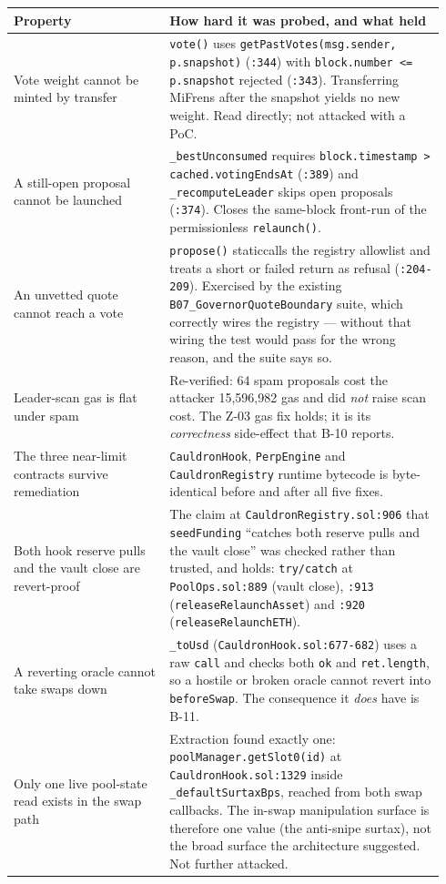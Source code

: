 \documentclass[11pt,a4paper]{article}
\newcommand{\code}[1]{\texttt{\small #1}}
\newcommand{\fileref}[1]{\texttt{\scriptsize #1}}
\begin{document}
\begin{longtable}{@{}p{0.34\linewidth}p{0.60\linewidth}@{}}
\toprule
\textbf{Property} & \textbf{How hard it was probed, and what held} \\
\midrule
\endhead
Vote weight cannot be minted by transfer &
  \code{vote()} uses \code{getPastVotes(msg.sender, p.snapshot)} (\fileref{:344}) with
  \code{block.number <= p.snapshot} rejected (\fileref{:343}). Transferring MiFrens after
  the snapshot yields no new weight. Read directly; not attacked with a PoC. \\
A still-open proposal cannot be launched &
  \code{\_bestUnconsumed} requires \code{block.timestamp > cached.votingEndsAt}
  (\fileref{:389}) and \code{\_recomputeLeader} skips open proposals (\fileref{:374}).
  Closes the same-block front-run of the permissionless \code{relaunch()}. \\
An unvetted quote cannot reach a vote &
  \code{propose()} staticcalls the registry allowlist and treats a short or failed return
  as refusal (\fileref{:204-209}). Exercised by the existing
  \code{B07\_GovernorQuoteBoundary} suite, which correctly wires the registry --- without
  that wiring the test would pass for the wrong reason, and the suite says so. \\
Leader-scan gas is flat under spam &
  Re-verified: 64 spam proposals cost the attacker 15{,}596{,}982 gas and did \emph{not}
  raise scan cost. The Z-03 gas fix holds; it is its \emph{correctness} side-effect that
  B-10 reports. \\
The three near-limit contracts survive remediation &
  \code{CauldronHook}, \code{PerpEngine} and \code{CauldronRegistry} runtime bytecode is
  byte-identical before and after all five fixes. \\
Both hook reserve pulls and the vault close are revert-proof &
  The claim at \fileref{CauldronRegistry.sol:906} that \code{seedFunding} ``catches both
  reserve pulls and the vault close'' was checked rather than trusted, and holds:
  \code{try/catch} at \fileref{PoolOps.sol:889} (vault close), \fileref{:913}
  (\code{releaseRelaunchAsset}) and \fileref{:920} (\code{releaseRelaunchETH}). \\
A reverting oracle cannot take swaps down &
  \code{\_toUsd} (\fileref{CauldronHook.sol:677-682}) uses a raw \code{call} and checks
  both \code{ok} and \code{ret.length}, so a hostile or broken oracle cannot revert into
  \code{beforeSwap}. The consequence it \emph{does} have is B-11. \\
Only one live pool-state read exists in the swap path &
  Extraction found exactly one: \code{poolManager.getSlot0(id)} at
  \fileref{CauldronHook.sol:1329} inside \code{\_defaultSurtaxBps}, reached from both swap
  callbacks. The in-swap manipulation surface is therefore one value (the anti-snipe
  surtax), not the broad surface the architecture suggested. Not further attacked. \\
\bottomrule
\end{longtable}
\end{document}
